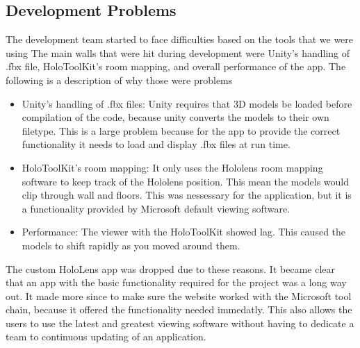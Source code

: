     \subsection{Development Problems}
    The development team started to face difficulties based on the tools that we were using
    The main walls that were hit during development were Unity's handling of .fbx file, HoloToolKit's room mapping, and overall performance of the app.
    The following is a description of why those were problems
    \begin{itemize}
        \item Unity's handling of .fbx files: Unity requires that 3D models be loaded before compilation of the code, because unity converts the models to their own filetype.
        This is a large problem because for the app to provide the correct functionality it needs to load and display .fbx files at run time.
        \item HoloToolKit's room mapping: It only uses the Hololens room mapping software to keep track of the Hololens position.
        This mean the models would clip through wall and floors. This was nessessary for the application, but it is a functionality provided by Microsoft default viewing software.
        \item Performance: The viewer with the HoloToolKit showed lag. This caused the models to shift rapidly as you moved around them. 
    \end{itemize}

    The custom HoloLens app was dropped due to these reasons. It became clear that an app with the basic functionality required for the project was a long way out.
    It made more since to make sure the website worked with the Microsoft tool chain, because it offered the functionality needed immedatly.
    This also allows the users to use the latest and greatest viewing software without having to dedicate a team to continuous updating of an application.
